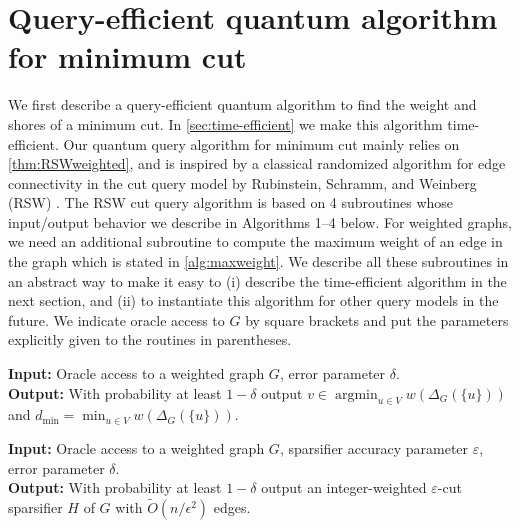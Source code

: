 \documentclass[10pt,a4paper]{article}
\DeclareMathOperator*{\argmin}{argmin}
\newcommand{\tO}{\tilde O}
\newcommand{\1}{\mathbf{1}}
\theoremstyle{definition}
\begin{document}


\section{Query-efficient quantum algorithm for minimum cut} \label{sec:query-efficient}
We first describe a query-efficient quantum algorithm to find the weight and shores of a minimum cut.
In \cref{sec:time-efficient} we make this algorithm time-efficient.
Our quantum query algorithm for minimum cut mainly relies on \cref{thm:RSWweighted}, and is inspired by a classical randomized algorithm for edge connectivity in the cut query model by Rubinstein, Schramm, and Weinberg (RSW) \cite{RSW18}.  
The RSW cut query algorithm is based on 4 subroutines whose input/output behavior we describe in Algorithms 1--4 below.  
For weighted graphs, we need an additional subroutine to compute the maximum weight of an edge in the graph which is stated in \cref{alg:maxweight}.
We describe all these subroutines in an abstract way to make it easy to (i) describe the time-efficient algorithm in the next section, and (ii) to instantiate this algorithm for other query models in the future.
We indicate oracle access to $G$ by square brackets and put the parameters explicitly given to the routines in parentheses.

\begin{algorithm}[H]
\caption{FindMinStar$[G](\delta)$}
\label{alg:mindeg}
 \hspace*{\algorithmicindent} \textbf{Input:} Oracle access to a weighted graph $G$, error parameter $\delta$. \\
 \hspace*{\algorithmicindent} \textbf{Output:} With probability at least $1-\delta$ output $v \in \argmin_{u \in V} w(\Delta_G(\{u\}))$ and 
 $d_{\min} = \min_{u \in V} w(\Delta_G(\{u\}))$.
\end{algorithm}

\begin{algorithm}[H]
\caption{Cut-Sparsifier$[G](\varepsilon, \delta)$}
\label{alg:sparsify}
 \hspace*{\algorithmicindent} \textbf{Input:} Oracle access to a weighted graph $G$, sparsifier accuracy parameter $\varepsilon$, error parameter $\delta$. \\
 \hspace*{\algorithmicindent} \textbf{Output:} With probability at least $1-\delta$ output an integer-weighted $\varepsilon$-cut sparsifier $H$ of $G$ with $\tO(n/\epsilon^2)$ edges.
\end{algorithm}
\end{document}
